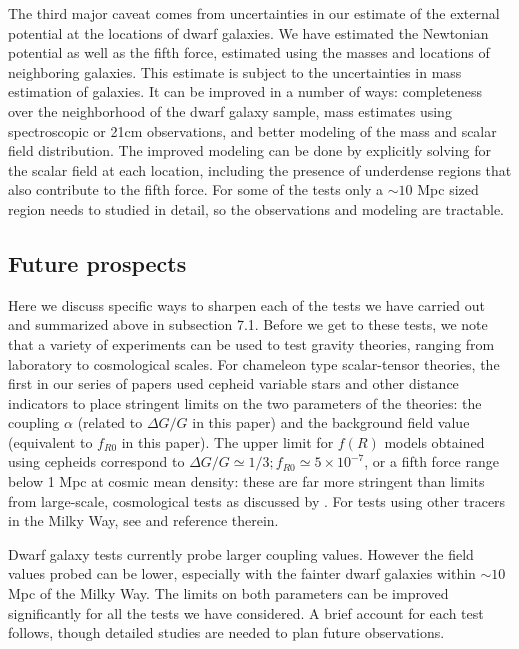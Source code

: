 \documentclass{emulateapj}
\begin{document}
The third major caveat comes from uncertainties in our estimate of the 
external potential at the locations of dwarf galaxies. We have estimated the 
Newtonian potential as well as the fifth force, estimated using the masses 
and locations of neighboring galaxies. This estimate is subject to the 
uncertainties in mass estimation of galaxies. It can be improved in a number of 
ways: completeness over the neighborhood of the dwarf galaxy
sample, mass estimates using spectroscopic or 21cm observations, and better modeling of the mass and scalar field distribution. The improved modeling 
can be done by explicitly solving for the scalar field at each location, including the 
presence of underdense regions that also contribute to the fifth force. For some
of the tests only a $\sim 10$ Mpc sized region needs to studied in detail, so 
the observations and modeling are tractable. 

\subsection{Future prospects}
Here we discuss specific ways to sharpen each of the tests we have carried out and summarized above in subsection 7.1. Before we get to these tests, we note that a variety of experiments can be used to test gravity theories, ranging from laboratory to cosmological scales. For chameleon type scalar-tensor theories, the first in our series of papers \citep{jainvinu2012} used cepheid variable stars and other distance indicators to place stringent limits on the two parameters of the theories: the coupling $\alpha$ (related to $\Delta G/G$ in this paper) and the background field value (equivalent to $f_{R0}$ in this paper).  The upper limit for $f(R)$ models obtained using cepheids correspond to $\Delta G/G\simeq 1/3; f_{R0}\simeq 5\times10^{-7}$, or a fifth force range below 1 Mpc at cosmic mean density: these are far more stringent than limits from large-scale, cosmological tests as discussed by \citet{jainvinu2012}. For tests using other tracers in the Milky Way, see \citet{Brax2013} and reference therein. 

Dwarf galaxy tests currently probe larger coupling values. However the field values probed can be lower, especially with the fainter dwarf galaxies within $\sim 10$ Mpc of the Milky Way. The limits on both parameters can be improved significantly 
for all the tests we have considered. A brief account for each test follows, though 
detailed studies are needed to plan future observations.  
\end{document}
